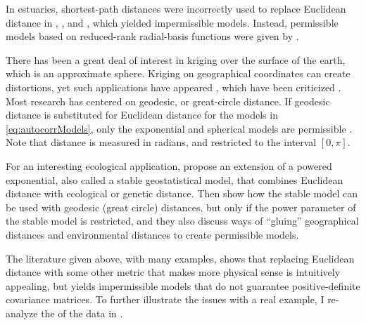 In estuaries, shortest-path distances were incorrectly used to replace Euclidean distance in \citet{Litt:Edwa:Port:krig:1997}, \citet{Rath:spat:1998}, and \citet{Jens:Chri:Mill:land:2006}, which yielded impermissible models.  Instead, permissible models based on reduced-rank radial-basis functions were given by \citet{Wang:Rana:low:2007}.

There has been a great deal of interest in kriging over the surface of the earth, which is an approximate sphere.  Kriging on geographical coordinates can create distortions, yet such applications have appeared \citep{Ecke:Gelf:baye:1997,Kalu:Vega:Card:Shel:anal:1998}, which have been criticized \citep{Bane:geod:2005}. Most research has centered on geodesic, or great-circle distance. If geodesic distance is substituted for Euclidean distance for the models in \ref{eq:autocorrModels}, only the exponential and spherical models are permissible \citep{Gnei:stri:2013}.  Note that distance is measured in radians, and restricted to the interval $[0,\pi]$.

For an interesting ecological application, \citet{Brad:Ralp:Coop:dise:2013} propose an extension of a powered exponential, also called a stable geostatistical model, that combines Euclidean distance with ecological or genetic distance. Then \citet{Guil:Schi:Porc:Bevi:vali:2014} show how the stable model can be used with geodesic (great circle) distances, but only if the power parameter of the stable model is restricted, and they also discuss ways of ``gluing'' geographical distances and environmental distances to create permissible models.

The literature given above, with many examples, shows that replacing Euclidean distance with some other metric that makes more physical sense is intuitively appealing, but yields impermissible models that do not guarantee positive-definite covariance matrices. To further illustrate the issues with a real example, I re-analyze the of the data in \citet{Ladl:Avga:Whea:Boyc:pred:2016}. 





